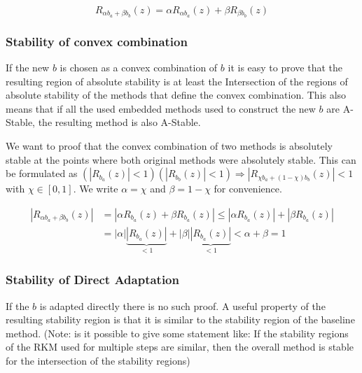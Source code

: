 \documentclass{article}
\begin{document}
\begin{equation}
R_{\alpha b_a+\beta b_b}(z) = \alpha R_{\alpha b_a}(z) + \beta R_{\beta b_b}(z) 
\end{equation}




\subsubsection{Stability of convex combination}
If the new $b$ is chosen as a convex combination of $b$ it is easy to prove that the resulting region of absolute stability is at least the Intersection of the regions of absolute stability of the methods that define the convex combination. This also means that if all the used embedded methods used to construct the new $b$ are A-Stable, the resulting method is also A-Stable.

We want to proof that the convex combination of two methods is absolutely stable at the points where both original methods were absolutely stable.
This can be formulated as $(|R_{b_a}(z)|  < 1) (|R_{b_b}(z)| < 1) \Rightarrow |R_{\chi b_a +(1- \chi) b_b}(z)| < 1$ with $\chi \in [0,1]$.
We write $\alpha = \chi$ and $\beta = 1-\chi$ for convenience.

\begin{align}
|R_{\alpha b_a +\beta b_b}(z)| &= |\alpha R_{b_a}(z) + \beta R_{b_a}(z)| \leq |\alpha R_{b_a}(z)| + |\beta R_{b_a}(z)|\\
 &=| \alpha| \underbrace{|R_{b_a}(z)|}_{<1} + |\beta| \underbrace{|R_{b_a}(z)|}_{<1} < \alpha + \beta = 1
\end{align}



\subsubsection{Stability of  Direct Adaptation}
If the $b$ is adapted directly there is no such proof.
A useful property of the resulting stability region is that it is similar to the stability region of the baseline method. 
(Note: is it possible to give some statement like: If the stability regions of the RKM used for multiple steps are similar, then the overall method is stable for the intersection of the stability regions)
\end{document}
